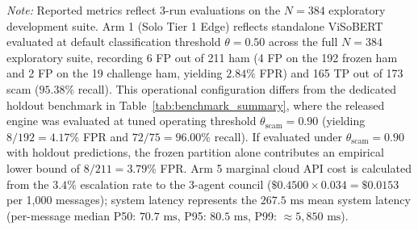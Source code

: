 \documentclass[journal]{IEEEtran}
\begin{document}
\begin{table}[t]
\centering
\caption{3-Run Median Comparative Benchmark Across System Architectures ($N=384$ Combined Development Samples, $\tau=0.90$)}
\label{tab:e2e_benchmark}
\vspace{1ex}
\parbox{\textwidth}{\footnotesize \textit{Note:} Reported metrics reflect 3-run evaluations on the $N=384$ exploratory development suite. Arm 1 (Solo Tier 1 Edge) reflects standalone ViSoBERT evaluated at default classification threshold $\theta = 0.50$ across the full $N=384$ exploratory suite, recording 6 FP out of 211 ham (4 FP on the 192 frozen ham and 2 FP on the 19 challenge ham, yielding $2.84\%$ FPR) and 165 TP out of 173 scam ($95.38\%$ recall). This operational configuration differs from the dedicated holdout benchmark in Table~\ref{tab:benchmark_summary}, where the released engine was evaluated at tuned operating threshold $\theta_{\text{scam}} = 0.90$ (yielding $8/192 = 4.17\%$ FPR and $72/75 = 96.00\%$ recall). If evaluated under $\theta_{\text{scam}}=0.90$ with holdout predictions, the frozen partition alone contributes an empirical lower bound of $8/211 = 3.79\%$ FPR. Arm 5 marginal cloud API cost is calculated from the $3.4\%$ escalation rate to the 3-agent council ($\$0.4500 \times 0.034 = \$0.0153$ per 1,000 messages); system latency represents the $267.5\text{ ms}$ mean system latency (per-message median P50: $70.7\text{ ms}$, P95: $80.5\text{ ms}$, P99: $\approx 5,850\text{ ms}$).}
\end{table}
\end{document}
